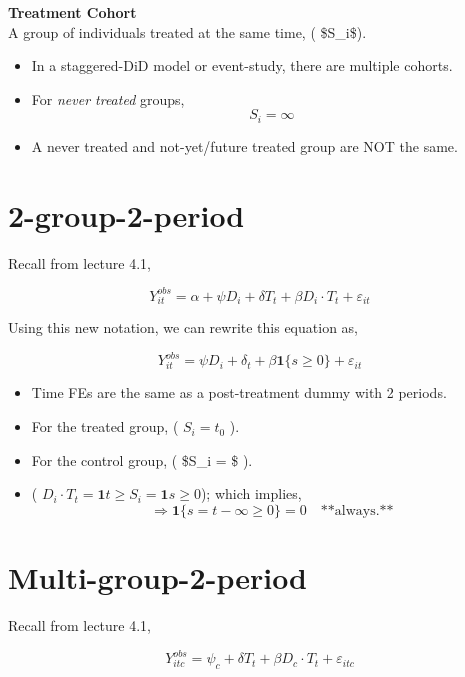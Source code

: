 \documentclass[
  letterpaper,
  DIV=11,
  numbers=noendperiod]{scrreprt}
\providecommand{\tightlist}{%
  \setlength{\itemsep}{0pt}\setlength{\parskip}{0pt}}\usepackage{longtable,booktabs,array}
\theoremstyle{definition}
\theoremstyle{remark}
\begin{document}
\begin{enumerate}
\begin{tcolorbox}
  \textbf{Treatment Cohort}\\
  A group of individuals treated at the same time, ( \$S\_i\$).

  \end{tcolorbox}

  \begin{itemize}
  \tightlist
  \item
    In a staggered-DiD model or event-study, there are multiple cohorts.
  \item
    For \emph{never treated} groups, \[
    S_i = \infty
    \]
  \item
    A never treated and not-yet/future treated group are NOT the same.
  \end{itemize}

  \section{2-group-2-period}\label{group-2-period}

  Recall from lecture 4.1,

  \[
  Y^{obs}_{it} = \alpha + \psi D_i + \delta T_t + \beta D_i \cdot T_t + \varepsilon_{it}
  \]

  Using this new notation, we can rewrite this equation as,

  \[
  Y^{obs}_{it} = \psi D_i + \delta_t + \beta \mathbf{1}\{s \geq 0\} + \varepsilon_{it}
  \]

  \begin{itemize}
  \tightlist
  \item
    Time FEs are the same as a post-treatment dummy with 2 periods.
  \item
    For the treated group, ( \(S_i = t_0\) ).
  \item
    For the control group, ( \$S\_i = \infty \$ ).
  \item
    (
    \(D_i \cdot T_t = \mathbf{1}{t \geq S_i} = \mathbf{1}{s \geq 0}\));
    which implies, \[
    \Rightarrow \mathbf{1}\{s = t - \infty \geq 0\} = 0 \quad \text{**always.**}
    \]
  \end{itemize}

  \section{Multi-group-2-period}\label{multi-group-2-period-1}

  Recall from lecture 4.1,

  \[
  Y^{obs}_{itc} = \psi_c + \delta T_t + \beta D_c \cdot T_t + \varepsilon_{itc}
  \]


\end{enumerate}
\end{document}
